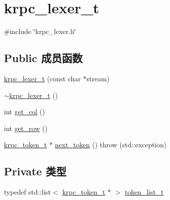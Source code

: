 \hypertarget{classkrpc__lexer__t}{}\section{krpc\+\_\+lexer\+\_\+t}
\label{classkrpc__lexer__t}


{\ttfamily \#include \char`\"{}krpc\+\_\+lexer.\+h\char`\"{}}

\subsection*{Public 成员函数}
\begin{DoxyCompactItemize}
\item 
\hyperlink{classkrpc__lexer__t_aef965ee4139d9bd6b0db053627a2e52d}{krpc\+\_\+lexer\+\_\+t} (const char $\ast$stream)
\item 
\hyperlink{classkrpc__lexer__t_af950a67f2446c73e417937a8af2b3597}{$\sim$krpc\+\_\+lexer\+\_\+t} ()
\item 
int \hyperlink{classkrpc__lexer__t_a8999d23f1d24a3c83cd09576b63dc10c}{get\+\_\+col} ()
\item 
int \hyperlink{classkrpc__lexer__t_abed0416ea8998a0934c9000f3b4bcd88}{get\+\_\+row} ()
\item 
\hyperlink{classkrpc__token__t}{krpc\+\_\+token\+\_\+t} $\ast$ \hyperlink{classkrpc__lexer__t_ad8cf136fc4a6adc94564e0bafcaecd83}{next\+\_\+token} ()  throw (std\+::exception)
\end{DoxyCompactItemize}
\subsection*{Private 类型}
\begin{DoxyCompactItemize}
\item 
typedef std\+::list$<$ \hyperlink{classkrpc__token__t}{krpc\+\_\+token\+\_\+t} $\ast$ $>$ \hyperlink{classkrpc__lexer__t_ad8bdce05269a6b358903a11c1e09d6ac}{token\+\_\+list\+\_\+t}
\end{DoxyCompactItemize}
